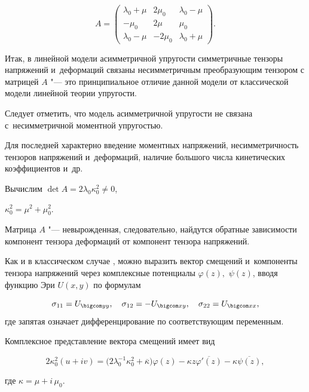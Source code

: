 $$A=\left(\begin{array}{ccc}

\lambda_{0}+\mu & 2\mu_{0}&\lambda_{0}-\mu\\

-\mu_{0} & 2\mu&\mu_{0}\\

\lambda_{0}-\mu&-2\mu_{0}&\lambda_{0}+\mu

\end{array}\right).$$

Итак, в линейной  модели асимметричной упругости  симметричные тензоры напряжений и~деформаций связаны несимметричным преобразующим тензором с матрицей $A$ "--- это принципиальное отличие данной модели от классической модели линейной теории упругости.



Следует отметить, что модель асимметричной упругости не связана с~несимметричной моментной упругостью. 

Для последней характерно введение моментных напряжений, несимметричность тензоров напряжений и~деформаций, наличие большого числа кинетических коэффициентов и~др.



Вычислим $\det A=2\lambda_{0}\kappa_{0}^{2}\neq0$,

$\kappa_{0}^{2}=\mu^2+\mu_{0}^{2}.$

Матрица $A$ "--- невырожденная, следовательно, найдутся обратные зависимости компонент тензора деформаций от компонент тензора напряжений.



Как и в классическом случае \cite{Mushelishvili}, можно выразить вектор смещений и~компоненты тензора напряжений через комплексные потенциалы $\varphi(z),$  $\psi(z)$, вводя функцию Эри $U(x,y)$ по формулам

$$\sigma_{11}=U_{\bigcom yy},\quad \sigma_{12}=-U_{\bigcom xy}, \quad \sigma_{22}=U_{\bigcom xx},$$ где запятая означает дифференцирование по соответствующим переменным.



Комплексное представление вектора смещений  имеет вид

$$2\kappa_{0}^{2}(u+iv)=\big(2\lambda_{0}^{-1}\kappa_{0}^{2}+\overline{\kappa}\big)\varphi(z)-

\kappa z \overline{\varphi'(z)}-\kappa \overline{\psi(z)},$$

где $\kappa=\mu+i\,\mu_{0}.$





